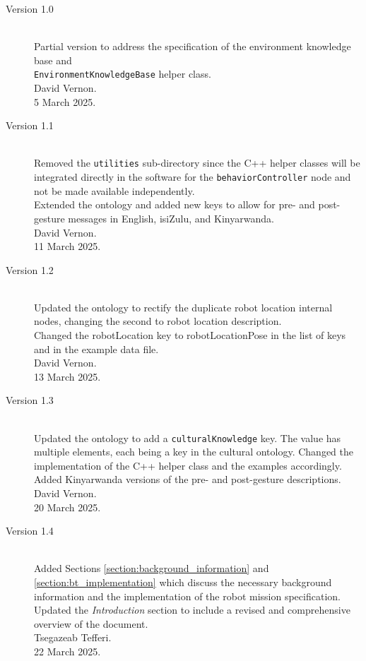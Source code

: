 \documentclass{CSSRforAfrica}
\begin{document}
\begin{description}

\item [Version 1.0]~\\
Partial version to address the specification of the environment knowledge base and \\{\small \tt EnvironmentKnowledgeBase} helper class. \\
David Vernon.\\
5 March 2025.                                            


\item [Version 1.1]~\\
Removed  the {\small \tt utilities} sub-directory since the C++ helper classes will be integrated directly in the software for the {\small \tt behaviorController} node and not be made available independently.\\
Extended the ontology and added new keys to allow for pre- and post-gesture messages in English, isiZulu, and Kinyarwanda.\\
David Vernon.\\
11 March 2025.     


\item [Version 1.2]~\\
Updated the ontology to rectify the duplicate robot location internal nodes, changing the second to robot location description.\\
Changed the robotLocation key to robotLocationPose in the list of keys and in the example data file.\\
David Vernon.\\
13 March 2025.   

\item [Version 1.3]~\\
Updated the ontology to add a {\small \tt culturalKnowledge} key. The value has multiple elements, each being a key in the cultural ontology. Changed the implementation of the C++ helper class and the examples accordingly. \\
Added Kinyarwanda versions of the pre- and post-gesture descriptions.\\
David Vernon.\\
20 March 2025.    

\item [Version 1.4]~\\
Added Sections \ref{section:background_information} and \ref{section:bt_implementation} which discuss the necessary background information and the implementation of the robot mission specification.\\
Updated the \textit{Introduction} section to include a revised and comprehensive overview of the document.\\
Tsegazeab Tefferi.\\
22 March 2025.  


\end{description}
\end{document}
